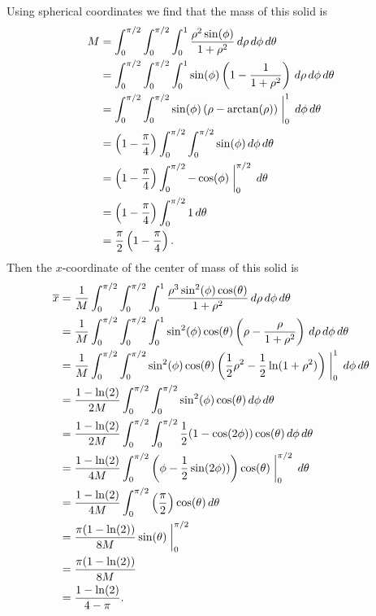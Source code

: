 \begin{exercises}
\begin{exerciseSolution}
	\item Using spherical coordinates we find that the mass of this solid is 
\begin{align*}
M &= \int_{0}^{\pi/2} \int_{0}^{\pi/2} \int_{0}^{1} \frac{\rho^2 \sin(\phi)}{1+\rho^2} \, d\rho \, d\phi \, d\theta \\
	&= \int_{0}^{\pi/2} \int_{0}^{\pi/2} \int_{0}^{1} \sin(\phi)\left(1-\frac{1}{1+\rho^2}\right) \, d\rho \, d\phi \, d\theta \\
	&= \int_{0}^{\pi/2} \int_{0}^{\pi/2}  \sin(\phi)\left(\rho - \arctan(\rho)\right) \biggm|_{0}^{1}  \, d\phi \, d\theta \\
	&= \left(1-\frac{\pi}{4}\right) \int_{0}^{\pi/2} \int_{0}^{\pi/2}  \sin(\phi) \, d\phi \, d\theta \\
	&= \left(1-\frac{\pi}{4}\right)  \int_{0}^{\pi/2} -\cos(\phi)\biggm|_{0}^{\pi/2} \, d\theta \\
	&= \left(1-\frac{\pi}{4}\right)  \int_{0}^{\pi/2} 1 \, d\theta \\
	&= \frac{\pi}{2}\left(1-\frac{\pi}{4}\right).
\end{align*}
Then the $x$-coordinate of the center of mass of this solid is 
\begin{align*}
\overline{x} &= \frac{1}{M} \int_{0}^{\pi/2} \int_{0}^{\pi/2} \int_{0}^{1} \frac{\rho^3 \sin^2(\phi) \cos(\theta)}{1+\rho^2} \, d\rho \, d\phi \, d\theta \\ 	
	 &= \frac{1}{M} \int_{0}^{\pi/2} \int_{0}^{\pi/2} \int_{0}^{1} \sin^2(\phi) \cos(\theta)\left(\rho-\frac{\rho}{1+\rho^2}\right) \, d\rho \, d\phi \, d\theta \\ 	
	 &= \frac{1}{M} \int_{0}^{\pi/2} \int_{0}^{\pi/2}  \sin^2(\phi) \cos(\theta)\left(\frac{1}{2}\rho^2-\frac{1}{2}\ln(1+\rho^2)\right)\biggm|_{0}^{1} \, d\phi \, d\theta \\ 
	 &= \frac{1-\ln(2)}{2M} \int_{0}^{\pi/2} \int_{0}^{\pi/2}  \sin^2(\phi) \cos(\theta) \, d\phi \, d\theta \\ 
	&= \frac{1-\ln(2)}{2M} \int_{0}^{\pi/2} \int_{0}^{\pi/2} \frac{1}{2}(1-\cos(2\phi)) \cos(\theta) \, d\phi \, d\theta \\
	&= \frac{1-\ln(2)}{4M} \int_{0}^{\pi/2}  \left(\phi -\frac{1}{2}\sin(2\phi))\right) \cos(\theta)\biggm|_{0}^{\pi/2} \, d\theta \\
	&= \frac{1-\ln(2)}{4M} \int_{0}^{\pi/2}  \left(\frac{\pi}{2}\right) \cos(\theta) \, d\theta \\
	&= \frac{\pi(1-\ln(2))}{8M}  \sin(\theta)\biggm|_{0}^{\pi/2} \\
	&= \frac{\pi(1-\ln(2))}{8M} \\
	&= \frac{1-\ln(2)}{4-\pi}. 
\end{align*}



\end{exerciseSolution}
\end{exercises}
